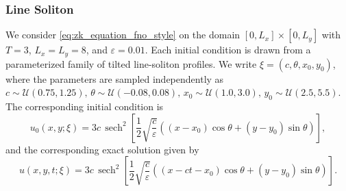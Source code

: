 \documentclass[11pt,a4paper]{article}
\DeclareMathOperator{\sech}{sech}
\theoremstyle{definition}
\theoremstyle{remark}
\numberwithin{equation}{section}
\numberwithin{figure}{section}
\numberwithin{table}{section}
\begin{document}
\subsubsection*{Line Soliton}
We consider \eqref{eq:zk_equation_fno_style} on the domain \([0,L_x]\times[0,L_y]\) with \(T=3\), \(L_x=L_y=8\), and \(\varepsilon=0.01\).
Each initial condition is drawn from a parameterized family of tilted line-soliton profiles. We write
\(\xi=(c,\theta,x_0,y_0)\), where the parameters are sampled independently as $c\sim \mathcal U(0.75,1.25),\, \theta\sim \mathcal U(-0.08,0.08),\, x_0\sim \mathcal U(1.0,3.0),\, y_0\sim \mathcal U(2.5,5.5).$ The corresponding initial condition is
\begin{equation}
    u_0(x,y;\xi)
    =
    3c\,\sech^2
    \left[
        \frac12
        \sqrt{\frac{c}{\varepsilon}}
        \left(
            (x-x_0)\cos\theta+(y-y_0)\sin\theta
        \right)
    \right],
    \label{eq:zk_line_ic_family}
\end{equation}
and the corresponding exact solution given by 
\begin{equation}
    u(x,y,t;\xi)
    =
    3c\,\sech^2
    \left[
        \frac12
        \sqrt{\frac{c}{\varepsilon}}
        \left(
            (x-ct-x_0)\cos\theta+(y-y_0)\sin\theta
        \right)
    \right].
    \label{eq:zk_line_solution_family}
\end{equation}

\end{document}
